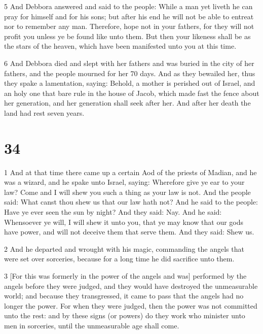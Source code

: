 \par 5 And Debbora answered and said to the people: While a man yet liveth he can pray for himself and for his sons; but after his end he will not be able to entreat nor to remember any man. Therefore, hope not in your fathers, for they will not profit you unless ye be found like unto them. But then your likeness shall be as the stars of the heaven, which have been manifested unto you at this time.

\par 6 And Debbora died and slept with her fathers and was buried in the city of her fathers, and the people mourned for her 70 days. And as they bewailed her, thus they spake a lamentation, saying: Behold, a mother is perished out of Israel, and an holy one that bare rule in the house of Jacob, which made fast the fence about her generation, and her generation shall seek after her. And after her death the land had rest seven years.

\chapter{34}

\par 1 And at that time there came up a certain Aod of the priests of Madian, and he was a wizard, and he spake unto Israel, saying: Wherefore give ye ear to your law? Come and I will shew you such a thing as your law is not. And the people said: What canst thou shew us that our law hath not? And he said to the people: Have ye ever seen the sun by night? And they said: Nay. And he said: Whensoever ye will, I will shew it unto you, that ye may know that our gods have power, and will not deceive them that serve them. And they said: Shew us. 

\par 2 And he departed and wrought with his magic, commanding the angels that were set over sorceries, because for a long time he did sacrifice unto them. 

\par 3 [For this was formerly in the power of the angels and was] performed by the angels before they were judged, and they would have destroyed the unmeasurable world; and because they transgressed, it came to pass that the angels had no longer the power. For when they were judged, then the power was not committed unto the rest: and by these signs (or powers) do they work who minister unto men in sorceries, until the unmeasurable age shall come. 

